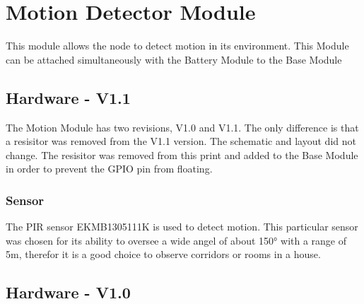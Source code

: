 \section{Motion Detector Module} 

    This module allows the node to detect motion in its environment. This Module can be 
    attached simultaneously with the Battery Module to the Base Module

    \subsection {Hardware - V1.1}
        The Motion Module has two revisions, V1.0 and V1.1. The only difference is that 
        a resisitor was removed from the V1.1 version. The schematic and layout did not 
        change. The resisitor was removed from this print and added to the Base Module
        in order to prevent the GPIO pin from floating.
        
    \subsubsection{Sensor}
        The PIR sensor EKMB1305111K is used to detect motion. This particular sensor was chosen
        for its ability to oversee a wide angel of about 150° with a range of 5m, therefor it is
        a good choice to observe corridors or rooms in a house.

    \subsection {Hardware - V1.0}